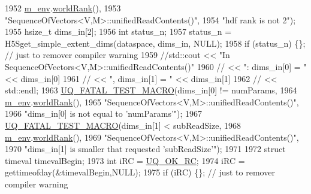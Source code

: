\begin{DoxyCode}
1952                                   \hyperlink{class_q_u_e_s_o_1_1_base_vector_sequence_a8e8824d2a63c5a43bcc6473e3a0491e8}{m\_env}.\hyperlink{class_q_u_e_s_o_1_1_base_environment_a78b57112bbd0e6dd0e8afec00b40ffa7}{worldRank}(),
1953                                   \textcolor{stringliteral}{"SequenceOfVectors<V,M>::unifiedReadContents()"},
1954                                   \textcolor{stringliteral}{"hdf rank is not 2"});
1955               hsize\_t dims\_in[2];
1956               \textcolor{keywordtype}{int}     status\_n;
1957               status\_n  = H5Sget\_simple\_extent\_dims(dataspace, dims\_in, NULL);
1958               \textcolor{keywordflow}{if} (status\_n) \{\}; \textcolor{comment}{// just to remover compiler warning}
1959         \textcolor{comment}{//std::cout << "In SequenceOfVectors<V,M>::unifiedReadContents()"}
1960               \textcolor{comment}{//          << ": dims\_in[0] = " << dims\_in[0]}
1961               \textcolor{comment}{//          << ", dims\_in[1] = " << dims\_in[1]}
1962               \textcolor{comment}{//          << std::endl;}
1963               \hyperlink{_defines_8h_a56d63d18d0a6d45757de47fcc06f574d}{UQ\_FATAL\_TEST\_MACRO}(dims\_in[0] != numParams,
1964                                   \hyperlink{class_q_u_e_s_o_1_1_base_vector_sequence_a8e8824d2a63c5a43bcc6473e3a0491e8}{m\_env}.\hyperlink{class_q_u_e_s_o_1_1_base_environment_a78b57112bbd0e6dd0e8afec00b40ffa7}{worldRank}(),
1965                                   \textcolor{stringliteral}{"SequenceOfVectors<V,M>::unifiedReadContents()"},
1966                                   \textcolor{stringliteral}{"dims\_in[0] is not equal to 'numParams'"});
1967               \hyperlink{_defines_8h_a56d63d18d0a6d45757de47fcc06f574d}{UQ\_FATAL\_TEST\_MACRO}(dims\_in[1] < subReadSize,
1968                                   \hyperlink{class_q_u_e_s_o_1_1_base_vector_sequence_a8e8824d2a63c5a43bcc6473e3a0491e8}{m\_env}.\hyperlink{class_q_u_e_s_o_1_1_base_environment_a78b57112bbd0e6dd0e8afec00b40ffa7}{worldRank}(),
1969                                   \textcolor{stringliteral}{"SequenceOfVectors<V,M>::unifiedReadContents()"},
1970                                   \textcolor{stringliteral}{"dims\_in[1] is smaller that requested 'subReadSize'"});
1971 
1972               \textcolor{keyword}{struct }timeval timevalBegin;
1973               \textcolor{keywordtype}{int} iRC = \hyperlink{namespace_q_u_e_s_o_a8e909502900aecf24cedba022ea84471}{UQ\_OK\_RC};
1974               iRC = gettimeofday(&timevalBegin,NULL);
1975               \textcolor{keywordflow}{if} (iRC) \{\}; \textcolor{comment}{// just to remover compiler warning}

\end{DoxyCode}
